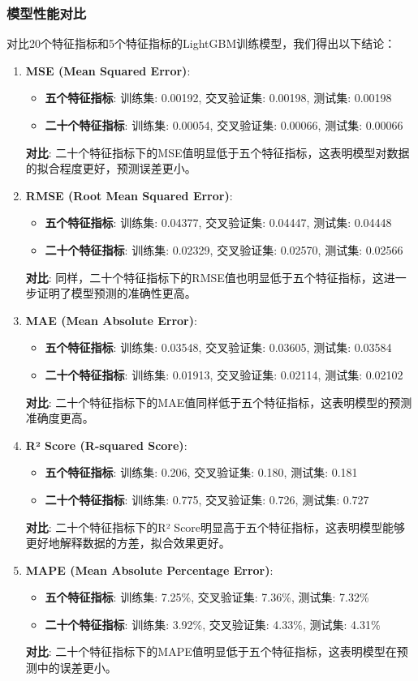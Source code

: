 \documentclass[withoutpreface,bwprint]{cumcmthesis} %
\begin{document}
\subsubsection{模型性能对比}
对比20个特征指标和5个特征指标的LightGBM训练模型，我们得出以下结论：
	\begin{enumerate}
		\item \textbf{MSE (Mean Squared Error)}:
		\begin{itemize}
			\item \textbf{五个特征指标}: 训练集: 0.00192, 交叉验证集: 0.00198, 测试集: 0.00198
			\item \textbf{二十个特征指标}: 训练集: 0.00054, 交叉验证集: 0.00066, 测试集: 0.00066
		\end{itemize}
		\textbf{对比}: 二十个特征指标下的MSE值明显低于五个特征指标，这表明模型对数据的拟合程度更好，预测误差更小。
		\item \textbf{RMSE (Root Mean Squared Error)}:
		\begin{itemize}
			\item \textbf{五个特征指标}: 训练集: 0.04377, 交叉验证集: 0.04447, 测试集: 0.04448
			\item \textbf{二十个特征指标}: 训练集: 0.02329, 交叉验证集: 0.02570, 测试集: 0.02566
		\end{itemize}
		\textbf{对比}: 同样，二十个特征指标下的RMSE值也明显低于五个特征指标，这进一步证明了模型预测的准确性更高。
		\item \textbf{MAE (Mean Absolute Error)}:
		\begin{itemize}
			\item \textbf{五个特征指标}: 训练集: 0.03548, 交叉验证集: 0.03605, 测试集: 0.03584
			\item \textbf{二十个特征指标}: 训练集: 0.01913, 交叉验证集: 0.02114, 测试集: 0.02102
		\end{itemize}
		\textbf{对比}: 二十个特征指标下的MAE值同样低于五个特征指标，这表明模型的预测准确度更高。
		\item \textbf{R² Score (R-squared Score)}:
		\begin{itemize}
			\item \textbf{五个特征指标}: 训练集: 0.206, 交叉验证集: 0.180, 测试集: 0.181
			\item \textbf{二十个特征指标}: 训练集: 0.775, 交叉验证集: 0.726, 测试集: 0.727
		\end{itemize}
		\textbf{对比}: 二十个特征指标下的R² Score明显高于五个特征指标，这表明模型能够更好地解释数据的方差，拟合效果更好。
		\item \textbf{MAPE (Mean Absolute Percentage Error)}:
		\begin{itemize}
			\item \textbf{五个特征指标}: 训练集: 7.25\%, 交叉验证集: 7.36\%, 测试集: 7.32\%
			\item \textbf{二十个特征指标}: 训练集: 3.92\%, 交叉验证集: 4.33\%, 测试集: 4.31\%
		\end{itemize}
		\textbf{对比}: 二十个特征指标下的MAPE值明显低于五个特征指标，这表明模型在预测中的误差更小。
	\end{enumerate}
	
\end{document}
